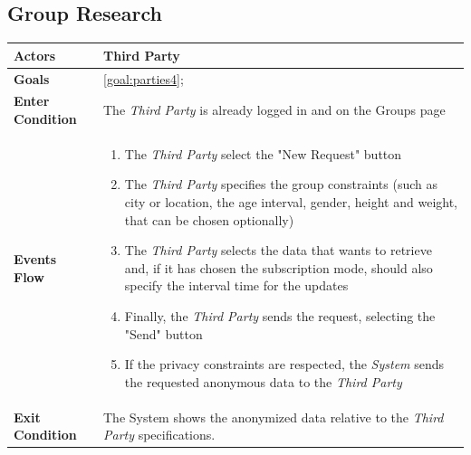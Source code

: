   \subsection{Group Research}


\begin{table}[H]
	\centering
    
    \begin{tabular}{|p{3.5cm}|p{10.3cm}|}
    
    \hline
    \textbf{\large{Actors}}  			& \tabitem Third Party 																\\
    \hline
    \textbf{\large{Goals}} 				& \ref{goal:parties4};\\
    
    \hline
    \textbf{\large{Enter Condition}}	& The \emph{Third Party} is already logged in	and on the Groups page	\\
    
    \hline
    \textbf{\large{Events Flow}}		& \begin{enumerate}[leftmargin=0.5cm]
                                \item The \emph{Third Party} select the "New Request" button
                                \item The \emph{Third Party} specifies the group constraints (such as city or location, the age interval, gender, height and weight, that can be chosen optionally)
                                 \item The \emph{Third Party} selects the data that wants to retrieve and, if it has chosen the subscription mode, should also specify the interval time for the updates
                                 \item Finally, the \emph{Third Party} sends the request, selecting the "Send" button
                                 \item If the privacy constraints are respected, the \emph{System} sends the requested anonymous data to the \emph{Third Party}
                                           
                                          \end{enumerate}
    										\\
    \hline
    \textbf{\large{Exit Condition}} 	& The System shows                             the anonymized data relative                              to the \emph{Third Party}                                 specifications. \\
    

\end{tabular}
\end{table}
